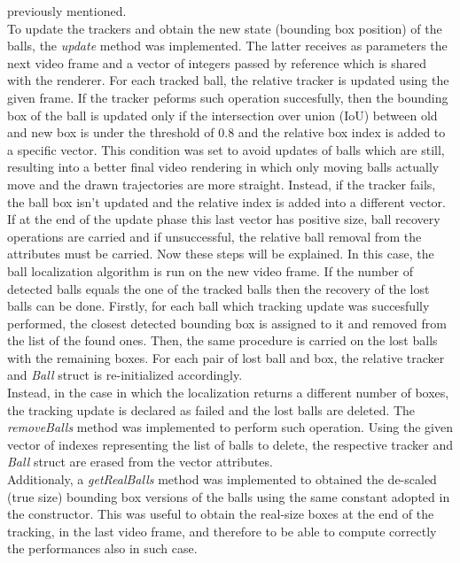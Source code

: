previously mentioned. 
\newline \\
To update the trackers and obtain the new state (bounding box position) of the balls, the \textit{update} method was implemented. The latter receives as parameters the next 
video frame and a vector of integers passed by reference which is shared with the renderer. For each tracked ball, the relative tracker is updated using the given frame.
If the tracker peforms such operation succesfully, then the bounding box of the ball is updated only if the intersection over union (IoU) between old and new box is under
the threshold of $0.8$ and the relative box index is added to a specific vector. This condition was set to avoid updates of balls which are still, resulting into a better final video rendering in which only moving balls actually move
and the drawn trajectories are more straight. Instead, if the tracker fails, the ball box isn't updated and the relative index is added into a different vector.
\newline \\
If at the end of the update phase this last vector has positive size, ball recovery operations are carried and if unsuccessful, the relative ball removal from the attributes 
must be carried. Now these steps will be explained. In this case, the ball localization algorithm is run on the new video frame. If the number of detected balls equals the one
of the tracked balls then the recovery of the lost balls can be done. Firstly, for each ball which tracking update was succesfully performed, the closest detected bounding box
is assigned to it and removed from the list of the found ones. Then, the same procedure is carried on the lost balls with the remaining boxes. For each pair of lost ball and box,
the relative tracker and \textit{Ball} struct is re-initialized accordingly.
\newline \\
Instead, in the case in which the localization returns a different number of boxes, the tracking update is declared as failed and the lost balls are deleted. 
The \textit{removeBalls} method was implemented to perform such operation. Using the given vector of indexes representing the list of balls to delete, the respective
tracker and \textit{Ball} struct are erased from the vector attributes.
\newline \\
Additionaly, a \textit{getRealBalls} method was implemented to obtained the de-scaled (true size) bounding box versions of the balls using the same constant adopted in
the constructor. This was useful to obtain the real-size boxes at the end of the tracking, in the last video frame, and therefore to be able to compute correctly
the performances also in such case.